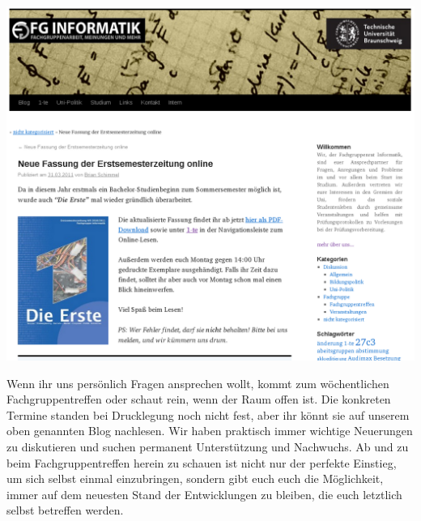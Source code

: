 \includegraphics[width=\columnwidth]{bilder/fgblog.png}

Wenn ihr uns persönlich Fragen ansprechen wollt, kommt zum wöchentlichen 
Fachgruppentreffen oder schaut rein, wenn der Raum offen ist.
Die konkreten Termine standen bei Drucklegung noch nicht fest, aber ihr könnt
sie auf unserem oben genannten Blog nachlesen. Wir haben praktisch immer wichtige 
Neuerungen zu diskutieren und suchen permanent Unterstützung und 
Nachwuchs. Ab und zu beim Fachgruppentreffen herein zu schauen ist 
nicht nur der perfekte Einstieg, um sich selbst einmal einzubringen, 
sondern gibt euch euch die Möglichkeit, immer auf dem neuesten Stand 
der Entwicklungen zu bleiben, die euch letztlich selbst betreffen werden.
